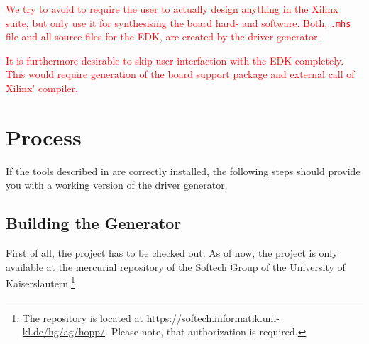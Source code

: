 \documentclass{report}
\begin{document}
 \textcolor{red}{We try to avoid to require the user to actually design anything in the Xilinx suite, but only use it for synthesising the board hard- and software. Both, \texttt{.mhs} file and all source files for the EDK, are created by the driver generator.}

\textcolor{red}{It is furthermore desirable to skip user-interfaction with the EDK completely. This would require generation of the board support package and external call of Xilinx' compiler.}

\section{Process}
\label{sec:process}
If the tools described in  are correctly installed, the following steps should provide you with a working version of the driver generator.

%
%
%
%
%
%
%

\subsection{Building the Generator}
First of all, the project has to be checked out. As of now, the project is only available at the mercurial repository of the Softech Group of the University of Kaiserslautern.\footnote{The repository is located at \url{https://softech.informatik.uni-kl.de/hg/ag/hopp/}. Please note, that authorization is required.}
\end{document}
